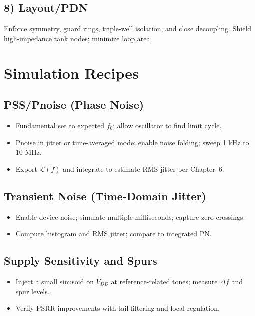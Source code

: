 \subsection*{8) Layout/PDN}
Enforce symmetry, guard rings, triple-well isolation, and close decoupling. Shield high-impedance tank nodes; minimize loop area.

\section{Simulation Recipes}
\subsection*{PSS/Pnoise (Phase Noise)}
\begin{itemize}
  \item Fundamental set to expected $f_0$; allow oscillator to find limit cycle.
  \item Pnoise in jitter or time-averaged mode; enable noise folding; sweep 1 kHz to 10 MHz.
  \item Export $\mathcal{L}(f)$ and integrate to estimate RMS jitter per Chapter~6.
\end{itemize}

\subsection*{Transient Noise (Time-Domain Jitter)}
\begin{itemize}
  \item Enable device noise; simulate multiple milliseconds; capture zero-crossings.
  \item Compute histogram and RMS jitter; compare to integrated PN.
\end{itemize}

\subsection*{Supply Sensitivity and Spurs}
\begin{itemize}
  \item Inject a small sinusoid on $V_{DD}$ at reference-related tones; measure $\Delta f$ and spur levels.
  \item Verify PSRR improvements with tail filtering and local regulation.
\end{itemize}

